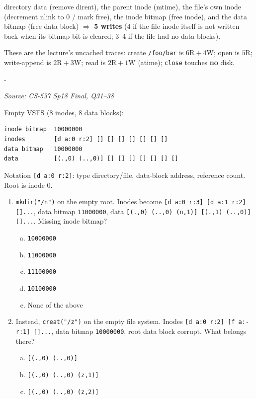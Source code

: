\documentclass[11pt,a4paper]{article}
\makeatletter
\newcommand{\keepspace}[1]{\par\penalty-100\begingroup
  \setlength{\dimen@}{#1}\dimen@ii\pagegoal\advance\dimen@ii-\pagetotal
  \ifdim\dimen@>\dimen@ii\ifdim\dimen@ii>\z@\vfil\fi\break\fi\endgroup}
\newcounter{qn}[section]
\newenvironment{Qn}[4]{%
  \refstepcounter{qn}\keepspace{7\baselineskip}%
  \begin{tcolorbox}[qboxstyle, title={Q\thesection.\theqn\ \ [#1 \textbar\ #2]\ \ #4}]%
  {\footnotesize\color{g3}\textit{Source: #3}}\par\smallskip%
}{%
  \end{tcolorbox}%
}
\newenvironment{Sol}{%
  \begin{tcolorbox}[sboxstyle, title={Solution}]%
}{%
  \end{tcolorbox}\vspace{0.35em}%
}
\makeatother
\begin{document}
\begin{Sol}
\begin{enumerate}[(a)]
      directory data (remove dirent), the parent inode (mtime), the
      file's own inode (decrement nlink to 0 / mark free), the inode
      bitmap (free inode), and the data bitmap (free data block)
      $\Rightarrow$ \textbf{5 writes} (4 if the file inode itself is not
      written back when its bitmap bit is cleared; 3--4 if the file had
      no data blocks).
\end{enumerate}
These are the lecture's uncached traces: create \texttt{/foo/bar} is
$6\mathrm{R}+4\mathrm{W}$; open is $5\mathrm{R}$; write-append is
$2\mathrm{R}+3\mathrm{W}$; read is $2\mathrm{R}+1\mathrm{W}$ (atime);
\texttt{close} touches \textbf{no} disk.
\end{Sol}

\begin{Qn}{Hard}{Lect 24}{CS-537 Sp18 Final, Q31--38}{Reconstruct a VSFS disk image}
Empty VSFS (8 inodes, 8 data blocks):
\begin{lstlisting}[numbers=none]
inode bitmap  10000000
inodes        [d a:0 r:2] [] [] [] [] [] [] []
data bitmap   10000000
data          [(.,0) (..,0)] [] [] [] [] [] [] []
\end{lstlisting}
Notation \texttt{[d a:0 r:2]}: type directory/file, data-block address,
reference count. Root is inode 0.
\begin{enumerate}[(31)]
\item \texttt{mkdir("/n")} on the empty root. Inodes become
      \texttt{[d a:0 r:3] [d a:1 r:2] []...}, data bitmap
      \texttt{11000000}, data
      \texttt{[(.,0) (..,0) (n,1)] [(.,1) (..,0)] []...}.
      Missing inode bitmap?
      \begin{enumerate}[(a)]
      \item \texttt{10000000}
      \item \texttt{11000000}
      \item \texttt{11100000}
      \item \texttt{10100000}
      \item None of the above
      \end{enumerate}
\item Instead, \texttt{creat("/z")} on the empty file system. Inodes
      \texttt{[d a:0 r:2] [f a:- r:1] []...}, data bitmap
      \texttt{10000000}, root data block corrupt. What belongs there?
      \begin{enumerate}[(a)]
      \item \texttt{[(.,0) (..,0)]}
      \item \texttt{[(.,0) (..,0) (z,1)]}
      \item \texttt{[(.,0) (..,0) (z,2)]}

\end{enumerate}
\end{enumerate}
\end{Qn}
\end{document}
